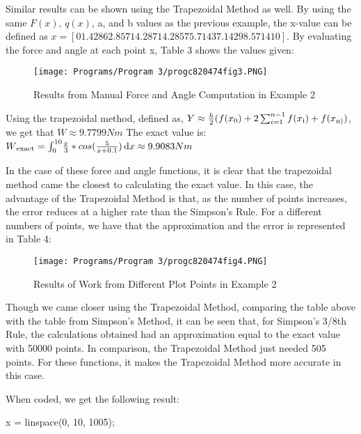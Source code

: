\documentclass{article}
\begin{document}
{\par \medskip
Similar results can be shown using the Trapezoidal Method as well.  By using the same $F(x)$, $q(x)$, a, and b values as the previous example, the x-value can be defined as $x=[0 1.4286 2.8571 4.2871 4.2857 5.7143 7.1429 8.5714 10]$.  By evaluating the force and angle at each point x, Table 3 shows the values given:
\par \medskip
 \begin{figure}[!ht]
\centering  %
\texttt{[image: Programs/Program 3/progc820474fig3.PNG]}
 \caption{Results from Manual Force and Angle Computation in Example 2}
 \label{f:Table 3}
\end{figure}
\par \medskip
Using the trapezoidal method, defined as,
$Y \approx \frac{h}{2} (f(x\textsubscript{0})+2\sum_{i=1}^{n-1} f(x\textsubscript{i})+f(x\textsubscript{n)})$,
     we get that 
$W \approx 9.7799 Nm$
     The exact value is:
$W\textsubscript{exact}=\int_{0}^{10}\! \frac{x}{3}*cos(\frac{5}{x+0.1}) \, \mathrm{d}x \approx 9.9083 Nm$
\par \medskip
      In the case of these force and angle functions, it is clear that the trapezoidal method came the closest to calculating the exact value.  In this case, the advantage of the Trapezoidal Method is that, as the number of points increases, the error reduces at a higher rate than the Simpson’s Rule. For a different numbers of points, we have that the approximation and the error is represented in Table 4:
\par \medskip
 \begin{figure}[!ht]
\centering  %
\texttt{[image: Programs/Program 3/progc820474fig4.PNG]}
 \caption{Results of Work from Different Plot Points in Example 2}
 \label{f:Table 4}
\end{figure}
\par \medskip
Though we came closer using the Trapezoidal Method, comparing the table above with the table from Simpson’s Method, it can be seen that, for Simpson’s 3/8th Rule, the calculations obtained had an approximation equal to the exact value with 50000 points. In comparison, the Trapezoidal Method just needed 505 points.  For these functions, it makes the Trapezoidal Method more accurate in this case.
\par \medskip
When coded, we get the following result:
\par \medskip
x = linspace(0, 10, 1005);
}
\end{document}
